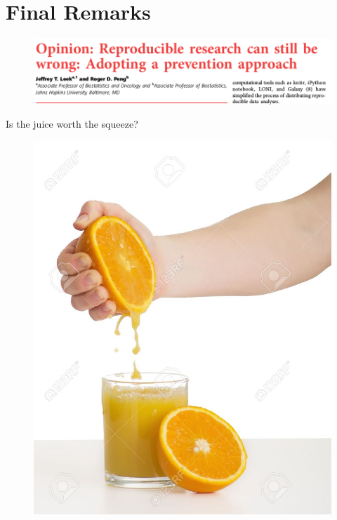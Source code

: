\documentclass[10pt]{beamer}\usepackage[]{graphicx}\usepackage[]{color}
\begin{document}
\section{Final Remarks}

\begin{frame}
\begin{figure}[h!]
\centering
\includegraphics[scale=0.30, keepaspectratio]{./leek}
\end{figure}
\end{frame}


\begin{frame}{Is the juice worth the squeeze?}
\begin{figure}[h!]
\centering
\includegraphics[scale=0.40, keepaspectratio]{./juice}
\end{figure}
\end{frame}
\end{document}
